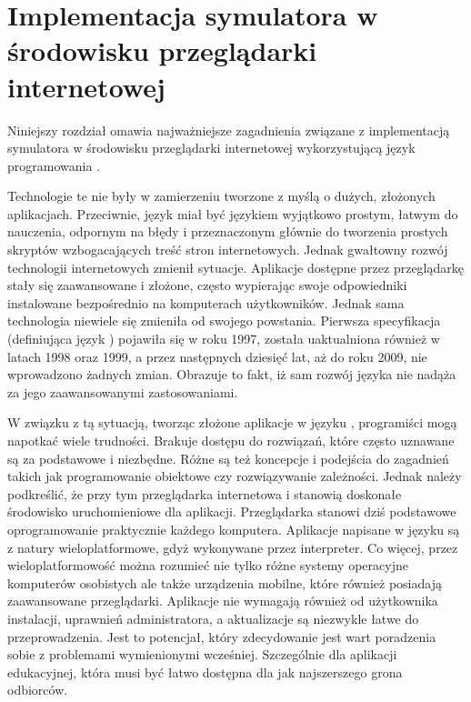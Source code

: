 \chapter{Implementacja symulatora w środowisku przeglądarki internetowej}

Niniejszy rozdział omawia najważniejsze zagadnienia związane z implementacją
symulatora \en w środowisku przeglądarki internetowej wykorzystującą język
programowania .

Technologie te nie były w zamierzeniu tworzone z myślą o dużych, złożonych
aplikacjach. Przeciwnie, język  miał być językiem wyjątkowo
prostym, łatwym do nauczenia, odpornym na błędy i przeznaczonym głównie do
tworzenia prostych skryptów wzbogacających treść stron internetowych. Jednak
gwałtowny rozwój technologii internetowych zmienił sytuacje. Aplikacje dostępne
przez przeglądarkę stały się zaawansowane i złożone, często wypierając swoje
odpowiedniki instalowane bezpośrednio na komputerach użytkowników. Jednak sama
technologia niewiele się zmieniła od swojego powstania. Pierwsza specyfikacja
 (definiująca język ) pojawiła się w roku 1997,
została uaktualniona również w latach 1998 oraz 1999, a przez następnych
dziesięć lat, aż do roku 2009, nie wprowadzono żadnych zmian. Obrazuje to fakt,
iż sam rozwój języka nie nadąża za jego zaawansowanymi zastosowaniami.

W związku z tą sytuacją, tworząc złożone aplikacje w języku \js, programiści
mogą napotkać wiele trudności. Brakuje dostępu do rozwiązań, które często
uznawane są za podstawowe i niezbędne. Różne są też koncepcje i podejścia do
zagadnień takich jak programowanie obiektowe czy rozwiązywanie zależności.
Jednak należy podkreślić, że przy tym przeglądarka internetowa i \js stanowią
doskonałe środowisko uruchomieniowe dla aplikacji. Przeglądarka stanowi dziś
podstawowe oprogramowanie praktycznie każdego komputera. Aplikacje napisane w
języku \js są z natury wieloplatformowe, gdyż wykonywane przez interpreter. Co
więcej, przez wieloplatformowość można rozumieć nie tylko różne systemy
operacyjne komputerów osobistych ale także urządzenia mobilne, które również
posiadają zaawansowane przeglądarki. Aplikacje \js nie wymagają również od
użytkownika instalacji, uprawnień administratora, a aktualizacje są niezwykle
łatwe do przeprowadzenia. Jest to potencjał, który zdecydowanie jest wart
poradzenia sobie z problemami wymienionymi wcześniej. Szczególnie dla aplikacji
edukacyjnej, która musi być łatwo dostępna dla jak najszerszego grona odbiorców.

